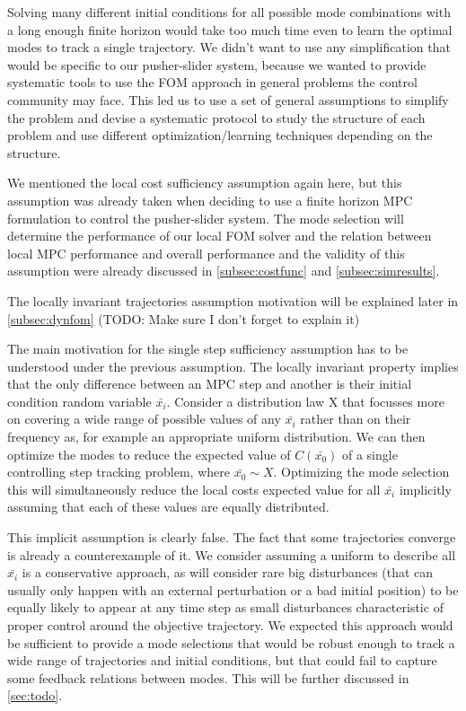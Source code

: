 \documentclass[12,twoside]{TFG-GM}
\theoremstyle{definition}
\theoremstyle{remark}
\newcommand*\diff[1]{\bar{#1}}
\begin{document}
Solving many different initial conditions for all possible mode combinations with a long enough finite horizon would take too much time even to learn the optimal modes to track a single trajectory. We didn't want to use any simplification that would be specific to our pusher-slider system, because we wanted to provide systematic tools to use the FOM approach in general problems the control community may face. This led us to use a set of general assumptions to simplify the problem and devise a systematic protocol to study the structure of each problem and use different optimization/learning techniques depending on the structure.

We mentioned the local cost sufficiency assumption again here, but this assumption was already taken when deciding to use a finite horizon MPC formulation to control the pusher-slider system. The mode selection will determine the performance of our local FOM solver and the relation between local MPC performance and overall performance and the validity of this assumption were already discussed in \ref{subsec:costfunc} and \ref{subsec:simresults}.

The locally invariant trajectories assumption motivation will be explained later in \ref{subsec:dynfom} (TODO: Make sure I don't forget to explain it)

The main motivation for the single step sufficiency assumption has to be understood under the previous assumption. The locally invariant property implies that the only difference between an MPC step and another is their initial condition random variable $\diff{x_i}$. Consider a distribution law X that focusses more on covering a wide range of possible values of any $\diff{x_i}$ rather than on their frequency as, for example an appropriate uniform distribution. We can then optimize the modes to reduce the expected value of $C(\diff{x_0})$ of a single controlling step tracking problem, where $\diff{x_0} \sim X$. Optimizing the mode selection this will simultaneously reduce the local costs expected value for all $\diff{x_i}$ implicitly assuming that each of these values are equally distributed.

This implicit assumption is clearly false. The fact that some trajectories converge is already a counterexample of it. We consider assuming a uniform to describe all $\diff{x_i}$ is a conservative approach, as will consider rare big disturbances (that can usually only happen with an external perturbation or a bad initial position) to be equally likely to appear at any time step as small disturbances characteristic of proper control around the objective trajectory. We expected this approach would be sufficient to provide a mode selections that would be robust enough to track a wide range of trajectories and initial conditions, but that could fail to capture some feedback relations between modes. This will be further discussed in \ref{sec:todo}.
\end{document}

